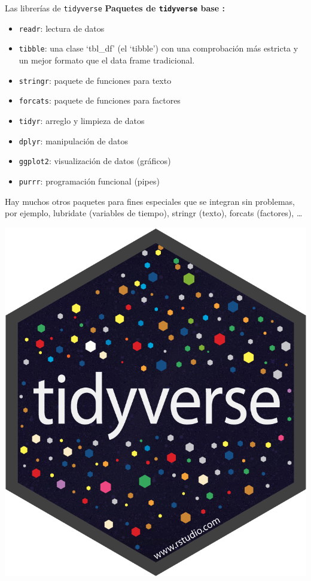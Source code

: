 \documentclass[
  ignorenonframetext,
  aspectratio=169]{beamer}
\providecommand{\tightlist}{%
  \setlength{\itemsep}{0pt}\setlength{\parskip}{0pt}}
\begin{document}
\begin{frame}[fragile]{Las librerías de \texttt{tidyverse}}
\protect\hypertarget{las-libreruxedas-de-tidyverse}{}
\textbf{Paquetes de \texttt{tidyverse} base :}

\begin{itemize}
\tightlist
\item
  \texttt{readr}: lectura de datos
\item
  \texttt{tibble}: una clase `tbl\_df' (el `tibble') con una
  comprobación más estricta y un mejor formato que el data frame
  tradicional.
\item
  \texttt{stringr}: paquete de funciones para texto
\item
  \texttt{forcats}: paquete de funciones para factores
\item
  \texttt{tidyr}: arreglo y limpieza de datos
\item
  \texttt{dplyr}: manipulación de datos
\item
  \texttt{ggplot2}: visualización de datos (gráficos)
\item
  \texttt{purrr}: programación funcional (pipes)
\end{itemize}

Hay muchos otros paquetes para fines especiales que se integran sin
problemas, por ejemplo, lubridate (variables de tiempo), stringr
(texto), forcats (factores), \ldots{}

\begin{flushright}\includegraphics[width=0.05\linewidth]{Imgs/hex-tidyverse} \end{flushright}
\end{frame}
\end{document}
